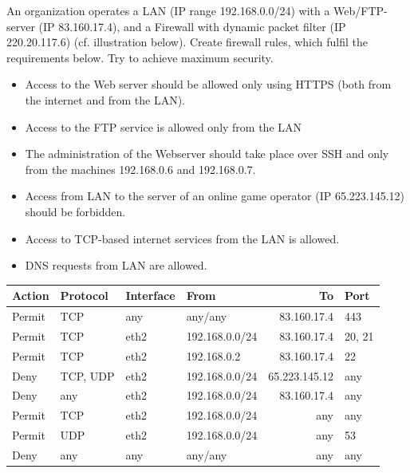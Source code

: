 \documentclass[11pt]{article}
\begin{document}
An organization operates a LAN (IP range 192.168.0.0/24) with a Web/FTP-server (IP 83.160.17.4), and a Firewall with dynamic packet filter (IP 220.20.117.6) (cf. illustration below). Create firewall rules, which fulfil the requirements below. Try to achieve maximum security.
\begin{itemize}
\item Access to the Web server should be allowed only using HTTPS (both from the internet and from the LAN).
\item Access to the FTP service is allowed only from the LAN
\item The administration of the Webserver should take place over SSH and only from the machines 192.168.0.6 and 192.168.0.7.
\item Access from LAN to the server of an online game operator (IP 65.223.145.12) should be forbidden.
\item Access to TCP-based internet services from the LAN is allowed.
\item DNS requests from LAN are allowed.
\end{itemize}

\begin{center}
\begin{tabular}{llllrl}
Action & Protocol & Interface & From & To & Port\\
\hline
Permit & TCP & any & any/any & 83.160.17.4 & 443\\
Permit & TCP & eth2 & 192.168.0.0/24 & 83.160.17.4 & 20, 21\\
Permit & TCP & eth2 & 192.168.0.2 & 83.160.17.4 & 22\\
Deny & TCP, UDP & eth2 & 192.168.0.0/24 & 65.223.145.12 & any\\
Deny & any & eth2 & 192.168.0.0/24 & 83.160.17.4 & any\\
Permit & TCP & eth2 & 192.168.0.0/24 & any & any\\
Permit & UDP & eth2 & 192.168.0.0/24 & any & 53\\
Deny & any & any & any/any & any & any\\
\end{tabular}
\end{center}
\end{document}
